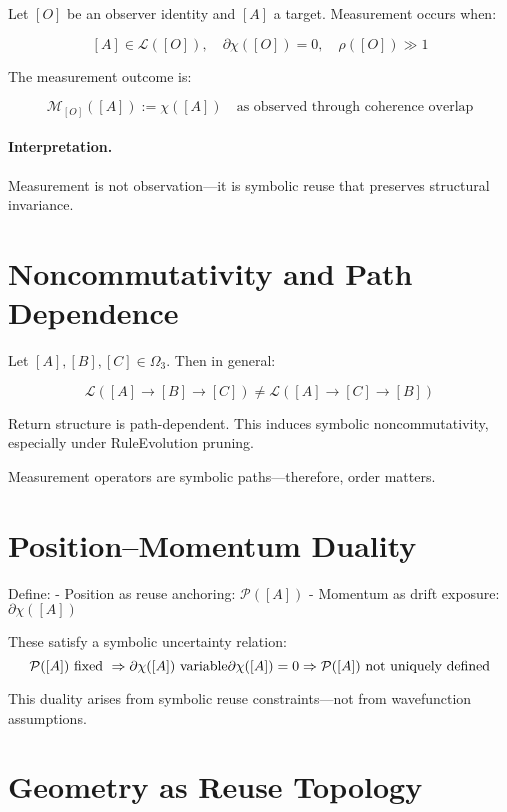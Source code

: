 Let $[O]$ be an observer identity and $[A]$ a target. Measurement occurs when:

\[
[A] \in \mathcal{L}([O]),\quad \partial\chi([O]) = 0,\quad \rho([O]) \gg 1
\]

The measurement outcome is:

\[
\mathcal{M}_{[O]}([A]) := \chi([A]) \quad \text{as observed through coherence overlap}
\]

\paragraph{Interpretation.}
Measurement is not observation—it is symbolic reuse that preserves structural invariance.

\section{Noncommutativity and Path Dependence} \label{sec:noncommutativity}

Let $[A], [B], [C] \in \Omega_3$. Then in general:

\[
\mathcal{L}([A] \to [B] \to [C]) \ne \mathcal{L}([A] \to [C] \to [B])
\]

Return structure is path-dependent. This induces symbolic noncommutativity, especially under RuleEvolution pruning.

Measurement operators are symbolic paths—therefore, order matters.

\section{Position–Momentum Duality} \label{sec:uncertainty}

Define:
- Position as reuse anchoring: $\mathcal{P}([A])$
- Momentum as drift exposure: $\partial\chi([A])$

These satisfy a symbolic uncertainty relation:
\[
\mathcal{P}([A]) \text{ fixed } \Rightarrow \partial\chi([A]) \text{ variable} \\
\partial\chi([A]) = 0 \Rightarrow \mathcal{P}([A]) \text{ not uniquely defined}
\]

This duality arises from symbolic reuse constraints—not from wavefunction assumptions.

\section{Geometry as Reuse Topology} \label{sec:geometry}

